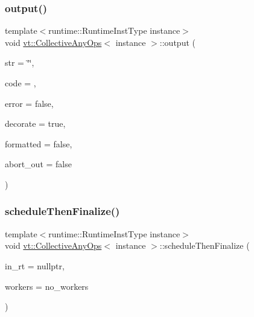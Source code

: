 \subsubsection{\texorpdfstring{output()}{output()}}
{\footnotesize\ttfamily template$<$runtime\+::\+Runtime\+Inst\+Type instance$>$ \\
void \hyperlink{structvt_1_1_collective_any_ops}{vt\+::\+Collective\+Any\+Ops}$<$ instance $>$\+::output (\begin{DoxyParamCaption}\item[{std\+::string const}]{str = {\ttfamily \char`\"{}\char`\"{}},  }\item[{\hyperlink{namespacevt_a793764d753923abc3d32929870beb485}{Error\+Code\+Type} const}]{code = {},  }\item[{bool}]{error = {\ttfamily false},  }\item[{bool}]{decorate = {\ttfamily true},  }\item[{bool}]{formatted = {\ttfamily false},  }\item[{bool}]{abort\+\_\+out = {\ttfamily false} }\end{DoxyParamCaption})\hspace{0.3cm}{\ttfamily [static]}}

\mbox{\label{structvt_1_1_collective_any_ops_a10be760566e5c50ce6d35ab93d7736ce}} 
\subsubsection{\texorpdfstring{schedule\+Then\+Finalize()}{scheduleThenFinalize()}}
{\footnotesize\ttfamily template$<$runtime\+::\+Runtime\+Inst\+Type instance$>$ \\
void \hyperlink{structvt_1_1_collective_any_ops}{vt\+::\+Collective\+Any\+Ops}$<$ instance $>$\+::schedule\+Then\+Finalize (\begin{DoxyParamCaption}\item[{\hyperlink{namespacevt_a0ce60e0299d8fa32223b3b9ffa0af466}{Runtime\+Ptr\+Type}}]{in\+\_\+rt = {\ttfamily nullptr},  }\item[{\hyperlink{namespacevt_aa93398ea48f2cb6c188512250f7cc248}{Worker\+Count\+Type} const}]{workers = {\ttfamily no\+\_\+workers} }\end{DoxyParamCaption})\hspace{0.3cm}{\ttfamily [static]}}

